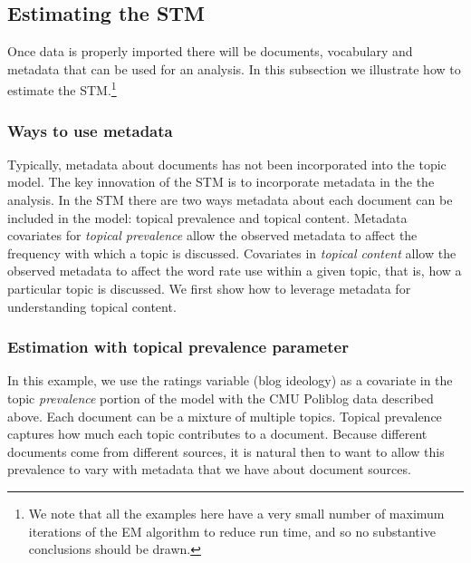 \documentclass[nojss]{jss}
\begin{document}
\begin{Schunk}
\end{Schunk}


\subsection{Estimating the STM}

Once data is properly imported there will be documents, vocabulary and metadata that can be used for an analysis. In this subsection we illustrate how to estimate the STM.\footnote{We note that all the examples here have a very small number of maximum iterations of the EM algorithm to reduce run time, and so no substantive conclusions should be drawn.}

\subsubsection{Ways to use metadata}

Typically, metadata about documents has not been incorporated into the topic model. The key innovation of the STM is to incorporate metadata in the the analysis. In the STM there are two ways metadata about each document can be included in the model: topical prevalence and topical content.  Metadata covariates for \emph{topical prevalence} allow the observed metadata to affect the frequency with which a topic is discussed.  Covariates in \emph{topical content} allow the observed metadata to affect the word rate use within a given topic, that is, how a particular topic is discussed. We first show how to leverage metadata for understanding topical content.

\subsubsection{Estimation with topical prevalence parameter}

In this example, we use the ratings variable (blog ideology) as a covariate in the topic \emph{prevalence} portion of the model with the CMU Poliblog data described above. Each document can be a mixture of multiple topics. Topical prevalence captures how much each topic contributes to a document. Because different documents come from different sources, it is natural then to want to allow this prevalence to vary with metadata that we have about document sources.
\end{document}
